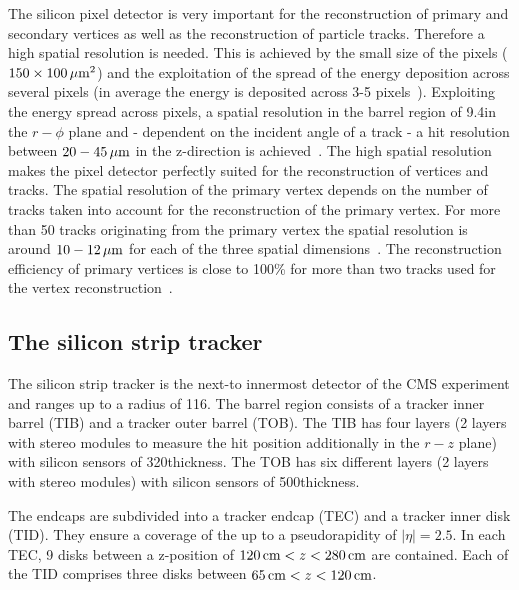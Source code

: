 The silicon pixel detector is very important for the reconstruction of primary and secondary vertices as well as the reconstruction of particle tracks.
Therefore a high spatial resolution is needed.
This is achieved by the small size of the pixels ($ 150 \times 100 \,\mu\text{m}^2$) and the exploitation of the spread of the energy deposition across several pixels (in average the energy is deposited across 3-5 pixels~\cite{bib:TWIKI:PixelClusterSize}).
Exploiting the energy spread across pixels, a spatial resolution in the barrel region of 9.4\mum in the $r - \phi$ plane and - dependent on the incident angle of a track - a hit resolution between $20-45\,\mu\text{m}$ in the z-direction is achieved~\cite{bib:CMS:tracking_8TeV}. 
The high spatial resolution makes the pixel detector perfectly suited for the reconstruction of vertices and tracks.
The spatial resolution of the primary vertex depends on the number of tracks taken into account for the reconstruction of the primary vertex.
For more than 50 tracks originating from the primary vertex the spatial resolution is around $10-12\,\mu\text{m}$ for each of the three spatial dimensions~\cite{bib:CMS:tracking_8TeV}.
The reconstruction efficiency of primary vertices is close to 100\% for more than two tracks used for the vertex reconstruction~\cite{bib:CMS:tracking_8TeV}.


\subsection*{The silicon strip tracker}
The silicon strip tracker is the next-to innermost detector of the CMS experiment and ranges up to a radius of 116\cm.
The barrel region consists of a tracker inner barrel (TIB) and a tracker outer barrel (TOB).
The TIB has four layers (2 layers with stereo modules to measure the hit position additionally in the $r-z$ plane) with silicon sensors of 320\mum thickness.
The TOB has six different layers (2 layers with stereo modules) with silicon sensors of 500\mum thickness. 

The endcaps are subdivided into a tracker endcap (TEC) and a tracker inner disk (TID).
They ensure a coverage of the up to a pseudorapidity of $|\eta|=2.5$.
In each TEC, 9 disks between a z-position of $120\,\text{cm} < z < 280\,\text{cm}$ are contained.
Each of the TID comprises three disks between $65\,\text{cm} < z < 120\,\text{cm}$.


